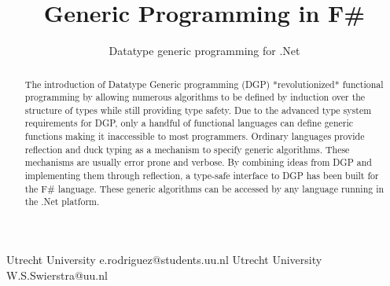 \documentclass{sigplanconf}
\begin{document}
\setlength{\pdfpageheight}{\paperheight}
\setlength{\pdfpagewidth}{\paperwidth}






\title{Generic Programming in F\#}
\subtitle{Datatype generic programming for .Net}

           {Utrecht University}
           {e.rodriguez@students.uu.nl}
           {Utrecht University}
           {W.S.Swierstra@uu.nl}

\maketitle

\begin{abstract}
The introduction of Datatype Generic programming (DGP) *revolutionized* functional programming by allowing numerous algorithms to be defined by induction over the structure of types while still providing type safety. Due to the advanced type system requirements for DGP, only a handful of functional languages can define generic functions making it inaccessible to most programmers. Ordinary languages provide reflection and duck typing as a mechanism to specify generic algorithms. These mechanisms are usually error prone and verbose. By combining ideas from DGP and implementing them through reflection, a type-safe interface to DGP has been built for the F\# language. These generic algorithms can be accessed by any language running in the .Net platform.
\end{abstract}

\end{document}
